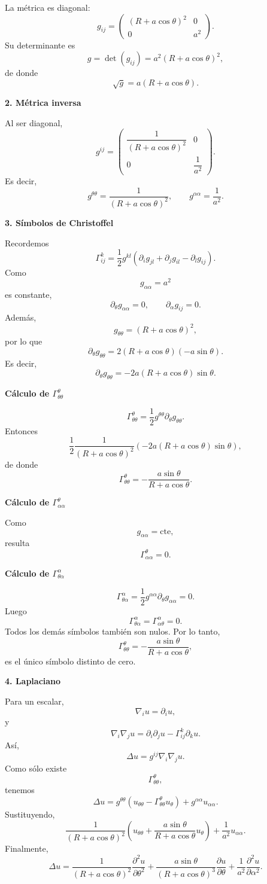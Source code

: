 \documentclass[11pt,spanish]{article}
\begin{document}
La métrica es diagonal:
$$
g_{ij}=
\begin{pmatrix}
(R+a\cos\theta)^2 & 0\\
0 & a^2
\end{pmatrix}.
$$
Su determinante es
$$
g=\det(g_{ij})
=a^2(R+a\cos\theta)^2,
$$
de donde
$$
\sqrt g
=a(R+a\cos\theta).
$$

{\bf 2. Métrica inversa}

Al ser diagonal,
$$
g^{ij}=
\begin{pmatrix}
\dfrac1{(R+a\cos\theta)^2} & 0\\
0 & \dfrac1{a^2}
\end{pmatrix}.
$$
Es decir,
$$
\boxed{
g^{\theta\theta}
=\frac1{(R+a\cos\theta)^2},
\qquad
g^{\alpha\alpha}
=\frac1{a^2}.
}
$$

{\bf 3. Símbolos de Christoffel}

Recordemos
$$
\Gamma^k_{ij}
=
\frac12
g^{kl}
\left(
\partial_i g_{jl}
+\partial_j g_{il}
-\partial_l g_{ij}
\right).
$$
Como
$$
g_{\alpha\alpha}=a^2
$$
es constante,
$$
\partial_\theta g_{\alpha\alpha}=0,
\qquad
\partial_\alpha g_{ij}=0.
$$
Además,
$$
g_{\theta\theta}
=(R+a\cos\theta)^2,
$$
por lo que
$$
\partial_\theta g_{\theta\theta}
=
2(R+a\cos\theta)(-a\sin\theta).
$$
Es decir,
$$
\partial_\theta g_{\theta\theta}
=
-2a(R+a\cos\theta)\sin\theta.
$$

{\bf Cálculo de $\Gamma^\theta_{\theta\theta}$}

$$
\Gamma^\theta_{\theta\theta}
=
\frac12
g^{\theta\theta}
\partial_\theta g_{\theta\theta}.
$$
Entonces
$$
\frac12
\frac1{(R+a\cos\theta)^2}
(-2a(R+a\cos\theta)\sin\theta),
$$
de donde
$$
\boxed{
\Gamma^\theta_{\theta\theta}
=
-\frac{a\sin\theta}
{R+a\cos\theta}.
}
$$

{\bf Cálculo de $\Gamma^\theta_{\alpha\alpha}$}

Como
$$
g_{\alpha\alpha}
=\text{cte},
$$
resulta
$$
\boxed{
\Gamma^\theta_{\alpha\alpha}=0.
}
$$

{\bf Cálculo de $\Gamma^\alpha_{\theta\alpha}$}

$$
\Gamma^\alpha_{\theta\alpha}
=
\frac12
g^{\alpha\alpha}
\partial_\theta g_{\alpha\alpha}=0.
$$
Luego
$$
\boxed{
\Gamma^\alpha_{\theta\alpha}
=
\Gamma^\alpha_{\alpha\theta}
=0.
}
$$
Todos los demás símbolos también son nulos.
Por lo tanto,
$$
\boxed{
\Gamma^\theta_{\theta\theta}
=
-\frac{a\sin\theta}
{R+a\cos\theta},
}
$$
es el único símbolo distinto de cero.

{\bf 4. Laplaciano}

Para un escalar,
$$
\nabla_i u=\partial_i u,
$$
y
$$
\nabla_i\nabla_j u
=
\partial_i\partial_j u
-
\Gamma^k_{ij}\partial_k u.
$$
Así,
$$
\Delta u
=
g^{ij}\nabla_i\nabla_ju.
$$
Como sólo existe
$$
\Gamma^\theta_{\theta\theta},
$$
tenemos
$$
\Delta u
=
g^{\theta\theta}
\left(
u_{\theta\theta}
-
\Gamma^\theta_{\theta\theta}u_\theta
\right)
+
g^{\alpha\alpha}
u_{\alpha\alpha}.
$$
Sustituyendo,
$$
\frac1{(R+a\cos\theta)^2}
\left(
u_{\theta\theta}
+
\frac{a\sin\theta}
{R+a\cos\theta}
u_\theta
\right)
+
\frac1{a^2}
u_{\alpha\alpha}.
$$
Finalmente,
$$
\boxed{
\Delta u
=
\frac{1}{(R+a\cos\theta)^2}
\frac{\partial^2u}{\partial\theta^2}
+
\frac{a\sin\theta}
{(R+a\cos\theta)^3}
\frac{\partial u}{\partial\theta}
+
\frac1{a^2}
\frac{\partial^2u}{\partial\alpha^2}.
}
$$
\end{document}
